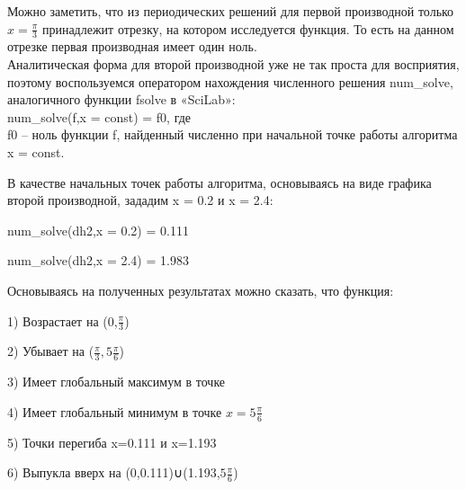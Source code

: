 \documentclass[russian,utf8,nocolumnxxxi,nocolumnxxxii]{eskdtext}
\begin{document}
Можно заметить, что из периодических решений для первой производной только $x=\frac{\pi}{3}$ принадлежит отрезку, на котором исследуется функция. То есть на данном отрезке первая производная имеет один ноль.\\
Аналитическая форма для второй производной уже не так проста для восприятия, поэтому воспользуемся оператором нахождения численного решения num\_solve, аналогичного функции fsolve в «SciLab»:\\
num\_solve(f,x = const) = f0, где\\

f0 – ноль функции f, найденный численно при начальной точке работы алгоритма x = const.

В качестве начальных точек работы алгоритма, основываясь на виде графика второй производной, зададим x = 0.2 и x = 2.4:

num\_solve(dh2,x = 0.2) = 0.111

num\_solve(dh2,x = 2.4) = 1.983

Основываясь на полученных результатах можно сказать, что функция:

1) Возрастает на (0,$\frac{\pi}{3}$)

2) Убывает на ($\frac{\pi}{3},5\frac{\pi}{6}$)

3) Имеет глобальный максимум в точке

4) Имеет глобальный минимум в точке $x=5\frac{\pi}{6}$

5) Точки перегиба x=0.111 и x=1.193

6) Выпукла вверх на (0,0.111)∪(1.193,$5\frac{\pi}{6}$)
\end{document}
